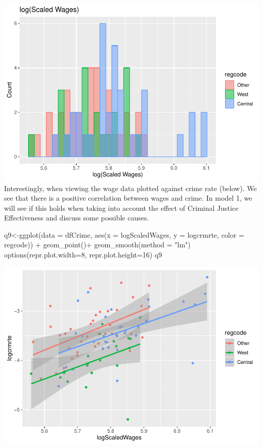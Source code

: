 \documentclass[]{article}
\newenvironment{Shaded}{}{}
\newcommand{\DataTypeTok}[1]{#1}
\newcommand{\DecValTok}[1]{#1}
\newcommand{\KeywordTok}[1]{\textcolor[rgb]{0.00,0.00,1.00}{#1}}
\newcommand{\NormalTok}[1]{#1}
\newcommand{\OperatorTok}[1]{#1}
\newcommand{\StringTok}[1]{\textcolor[rgb]{0.00,0.50,0.50}{#1}}
\begin{document}
\includegraphics{Bagnard_Gaustad_Hartman_Leung_Lab_3_files/figure-latex/unnamed-chunk-56-1.pdf}
Interestingly, when viewing the wage data plotted against crime rate
(below). We see that there is a positive correlation between wages and
crime. In model 1, we will see if this holds when taking into account
the effect of Criminal Justice Effectiveness and discuss some possible
causes.

\begin{Shaded}
\begin{Highlighting}[]
\NormalTok{q9<-}\KeywordTok{ggplot}\NormalTok{(}\DataTypeTok{data =}\NormalTok{ dfCrime, }\KeywordTok{aes}\NormalTok{(}\DataTypeTok{x =}\NormalTok{ logScaledWages, }\DataTypeTok{y =}\NormalTok{ logcrmrte, }\DataTypeTok{color =}\NormalTok{ regcode)) }\OperatorTok{+}
\StringTok{      }\KeywordTok{geom_point}\NormalTok{()}\OperatorTok{+}
\StringTok{  }\KeywordTok{geom_smooth}\NormalTok{(}\DataTypeTok{method =} \StringTok{"lm"}\NormalTok{)}
\KeywordTok{options}\NormalTok{(}\DataTypeTok{repr.plot.width=}\DecValTok{8}\NormalTok{, }\DataTypeTok{repr.plot.height=}\DecValTok{16}\NormalTok{)}
\NormalTok{q9}
\end{Highlighting}
\end{Shaded}

\includegraphics{Bagnard_Gaustad_Hartman_Leung_Lab_3_files/figure-latex/unnamed-chunk-57-1.pdf}
\end{document}
